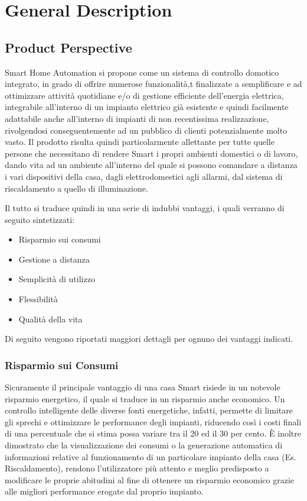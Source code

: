 \documentclass[12pt,a4paper]{report}
\begin{document}
\chapter{General Description}
\section{Product Perspective}
Smart Home Automation si propone come un sistema di controllo domotico integrato, in grado di offrire numerose funzionalità,t finalizzate a semplificare e ad ottimizzare attività quotidiane e/o di gestione efficiente dell’energia elettrica, integrabile all’interno di un impianto elettrico già esistente e quindi facilmente adattabile anche all’interno di impianti di non recentissima realizzazione, rivolgendosi conseguentemente ad un pubblico di clienti potenzialmente molto vasto. Il prodotto risulta quindi particolarmente allettante per tutte quelle persone che necessitano di rendere Smart i propri ambienti domestici o di lavoro, dando vita ad un ambiente all’interno del quale si possono comandare a distanza i vari dispositivi della casa, dagli elettrodomestici agli allarmi, dal sistema di riscaldamento a quello di illuminazione.


Il tutto si traduce quindi in una serie di indubbi vantaggi, i quali verranno di seguito sintetizzati:
\begin{itemize}

\item Risparmio sui consumi
\item Gestione a distanza
\item Semplicità di utilizzo
\item Flessibilità
\item Qualità della vita

\end{itemize}
Di seguito vengono riportati maggiori dettagli per ognuno dei vantaggi indicati.

\subsection{Risparmio sui Consumi}
Sicuramente il principale vantaggio di una casa Smart risiede in un notevole risparmio energetico, il quale si traduce in un risparmio anche economico. Un controllo intelligente delle diverse fonti energetiche, infatti, permette di limitare gli sprechi e ottimizzare le performance degli impianti, riducendo così i costi finali di una percentuale che si stima possa variare tra il 20 ed il 30 per cento. È inoltre dimostrato che la visualizzazione dei consumi o la generazione automatica di informazioni relative al funzionamento di un particolare impianto della casa (Es. Riscaldamento), rendono l’utilizzatore più attento e meglio predisposto a modificare le proprie abitudini al fine di ottenere un risparmio economico grazie alle migliori performance erogate dal proprio impianto.
\end{document}
